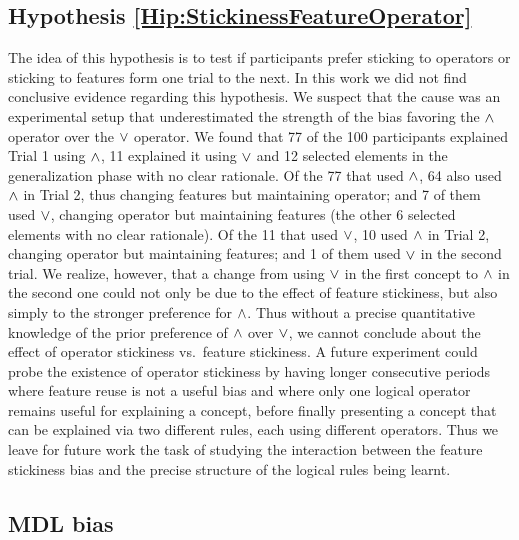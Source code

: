 \subsection{Hypothesis \ref{Hip:StickinessFeatureOperator}} \label{Results:StickinessFeatureOperator} 
The idea of this hypothesis is to test if participants prefer sticking to operators or sticking to features form one trial to the next. In this work we did not find conclusive evidence regarding this hypothesis. We suspect that the cause was an experimental setup that underestimated the strength of the bias favoring the $\land$ operator over the $\lor$ operator. We found that 77 of the 100 participants explained Trial 1 using $\land$, 11 explained it using $\lor$ and 12 selected elements in the generalization phase with no clear rationale. Of the 77 that used $\land$, 64 also used $\land$ in Trial 2, thus changing features but maintaining operator; and 7 of them used $\lor$, changing operator but maintaining features (the other 6 selected elements with no clear rationale). Of the 11 that used $\lor$, 10 used $\land$ in Trial 2, changing operator but maintaining features; and 1 of them used $\lor$ in the second trial. We realize, however, that a change from using $\lor$ in the first concept to $\land$ in the second one could not only be due to the effect of feature stickiness, but also simply to the stronger preference for $\land$. Thus without a precise quantitative knowledge of the prior preference of $\land$ over $\lor$, we cannot conclude about the effect of operator stickiness vs.\ feature stickiness. A future experiment could probe the existence of operator stickiness by having longer consecutive periods where feature reuse is not a useful bias and where only one logical operator remains useful for explaining a concept, before finally presenting a concept that can be explained via two different rules, each using different operators. Thus we leave for future work the task of studying the interaction between the feature stickiness bias and the precise structure of the logical rules being learnt. 



\subsection{MDL bias} \label{Resultados:MDLbias} 

